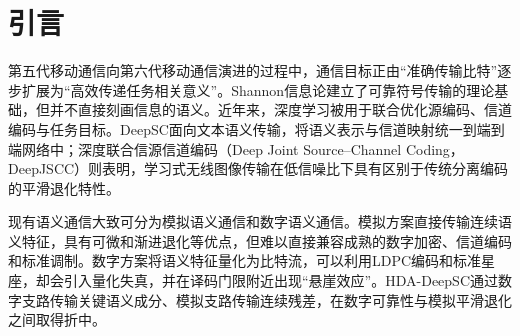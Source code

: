 \documentclass[UTF8,a4paper,11pt]{ctexart}
\newcommand{\HDADeepSC}{HDA-DeepSC}
\newcommand{\LDPC}{LDPC}
\begin{document}
\begin{abstract}
Hybrid digital--analog semantic communication combines a digital branch for essential semantic information and an analog branch for continuous residual information. This work reproduces an HDA-DeepSC image transmission system and extends its receiver to imperfect channel state information. Pilot-aided linear minimum mean square error channel estimation, controlled channel-estimation perturbations, and a differentiable noisy training surrogate are introduced. We diagnose why conventional least-squares and robust linear minimum mean square error equalizers can become nearly equivalent after gain-aware soft demodulation: the equalization coefficient cancels when both the residual gain and filtered-noise variance are consistently included in the log-likelihood-ratio metric. A raw-domain uncertainty-aware maximum-a-posteriori soft demodulator is therefore developed while preserving the original adaptive modulation and coding table. Preliminary controlled experiments in the 16-QAM region show average absolute bit-error-rate reductions of 0.0096, 0.0162, and 0.0230 for channel-estimation normalized mean square error values of 0.1, 0.2, and 0.5, with corresponding average peak-signal-to-noise-ratio gains of approximately 1.04, 1.45, and 1.06 dB.

\noindent\textbf{Keywords:} semantic communication; hybrid digital--analog transmission; imperfect channel state information; robust soft demodulation; maximum a posteriori detection; adaptive modulation and coding; Rician fading
\end{abstract}

\section{引言}
第五代移动通信向第六代移动通信演进的过程中，通信目标正由“准确传输比特”逐步扩展为“高效传递任务相关意义”。Shannon信息论建立了可靠符号传输的理论基础\cite{shannon1948}，但并不直接刻画信息的语义。近年来，深度学习被用于联合优化源编码、信道编码与任务目标。DeepSC面向文本语义传输，将语义表示与信道映射统一到端到端网络中\cite{xie2021deepsc}；深度联合信源信道编码（Deep Joint Source--Channel Coding，DeepJSCC）则表明，学习式无线图像传输在低信噪比下具有区别于传统分离编码的平滑退化特性\cite{bourtsoulatze2019deepjscc}。

现有语义通信大致可分为模拟语义通信和数字语义通信。模拟方案直接传输连续语义特征，具有可微和渐进退化等优点，但难以直接兼容成熟的数字加密、信道编码和标准调制。数字方案将语义特征量化为比特流，可以利用\LDPC{}编码和标准星座，却会引入量化失真，并在译码门限附近出现“悬崖效应”。\HDADeepSC{}通过数字支路传输关键语义成分、模拟支路传输连续残差，在数字可靠性与模拟平滑退化之间取得折中\cite{xie2025hda}。
\end{document}
